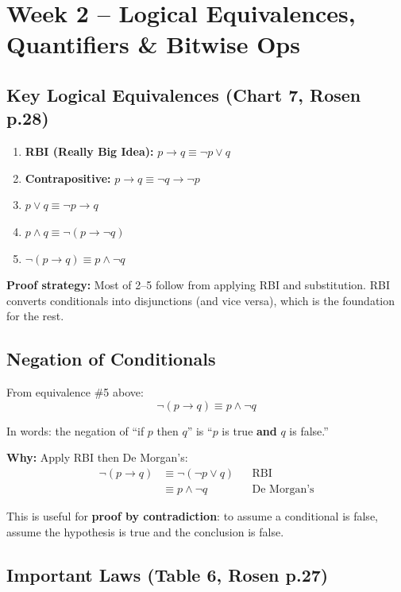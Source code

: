 \documentclass{article}
\newcommand{\sectionbreak}{\clearpage}
\begin{document}
\sectionbreak
\section*{Week 2 -- Logical Equivalences, Quantifiers \& Bitwise Ops}

\subsection*{Key Logical Equivalences (Chart 7, Rosen p.28)}

\begin{enumerate}[label=\arabic*.]
    \item \textbf{RBI (Really Big Idea):} $p \to q \equiv \neg p \lor q$
    \item \textbf{Contrapositive:} $p \to q \equiv \neg q \to \neg p$
    \item $p \lor q \equiv \neg p \to q$
    \item $p \land q \equiv \neg(p \to \neg q)$
    \item $\neg(p \to q) \equiv p \land \neg q$
\end{enumerate}

\medbreak
\textbf{Proof strategy:} Most of 2--5 follow from applying RBI and substitution. RBI converts conditionals into disjunctions (and vice versa), which is the foundation for the rest.

\subsection*{Negation of Conditionals}

From equivalence \#5 above:
\[\neg(p \to q) \equiv p \land \neg q\]

In words: the negation of ``if $p$ then $q$'' is ``$p$ is true \textbf{and} $q$ is false.''

\medbreak
\textbf{Why:} Apply RBI then De Morgan's:
\begin{align*}
    \neg(p \to q) &\equiv \neg(\neg p \lor q) & &\text{RBI} \\
                  &\equiv p \land \neg q & &\text{De Morgan's}
\end{align*}

This is useful for \textbf{proof by contradiction}: to assume a conditional is false, assume the hypothesis is true and the conclusion is false.

\subsection*{Important Laws (Table 6, Rosen p.27)}
\end{document}
